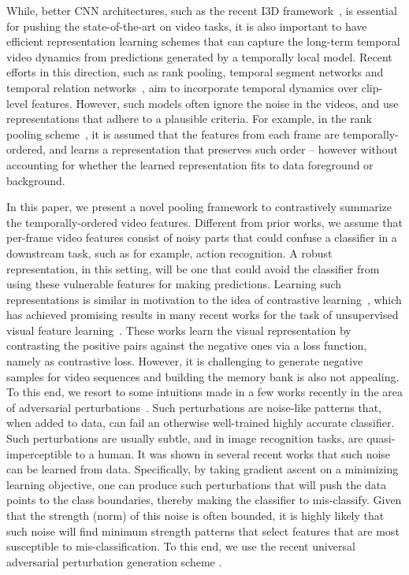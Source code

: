 \documentclass[runningheads]{llncs}
\begin{document}
While, better CNN architectures, such as the recent I3D framework~\cite{carreira2017quo}, is essential for pushing the state-of-the-art on video tasks, it is also important to have efficient representation learning schemes that can capture the long-term temporal video dynamics from predictions generated by a temporally local model. Recent efforts in this direction, such as rank pooling, temporal segment networks and temporal relation networks~\cite{Wang2016,grp,fernando2016learning,feichtenhofer2017temporal,fernando2015modeling,bilen2016dynamic,soo2017interpretable}, aim to incorporate temporal dynamics over clip-level features. However, such models often ignore the noise in the videos, and use representations that adhere to a plausible criteria. For example, in the  rank pooling scheme~\cite{grp,fernando2016learning,fernando2015modeling,bilen2016dynamic,fernando2016discriminative}, it is assumed that the features from each frame are temporally-ordered, and learns a representation that preserves such order -- however without accounting for whether the learned representation fits to data foreground or background. 

In this paper, we present a novel pooling framework to contrastively summarize the temporally-ordered video features. Different from prior works, we assume that per-frame video features consist of noisy parts that could confuse a classifier in a downstream task, such as for example, action recognition. A robust representation, in this setting, will be one that could avoid the classifier from using these vulnerable features for making predictions. Learning such representations is similar in motivation to the idea of contrastive learning~\cite{hadsell2006dimensionality}, which has achieved promising results in many recent works for the task of unsupervised visual feature learning~\cite{bachman2019learning,henaff2019data,hjelm2018learning,oord2018representation,tian2019contrastive,wu2018unsupervised,zhuang2019local,he2019momentum,chen2020simple}. These works learn the visual representation by contrasting the positive pairs against the negative ones via a loss function, namely as contrastive loss. However, it is challenging to generate negative samples for video sequences and building the memory bank is also not appealing. To this end, we resort to some intuitions made in a few works recently in the area of adversarial perturbations~\cite{lu2017safetynet,oh2017adversarial,moosavi2017universal,xie2017adversarial}. Such perturbations are noise-like patterns that, when added to data, can fail an otherwise well-trained highly accurate classifier. Such perturbations are usually subtle, and in image recognition tasks, are quasi-imperceptible to a human. It was shown in several recent works that such noise can be learned from data. Specifically, by taking gradient ascent on a minimizing learning objective, one can produce such perturbations that will push the data points to the class boundaries, thereby making the classifier to mis-classify. Given that the strength (norm) of this noise is often bounded, it is highly likely that such noise will find minimum strength patterns that select features that are most susceptible to mis-classification. To this end, we use the recent universal adversarial perturbation generation scheme \cite{moosavi2017universal}. 
\end{document}
